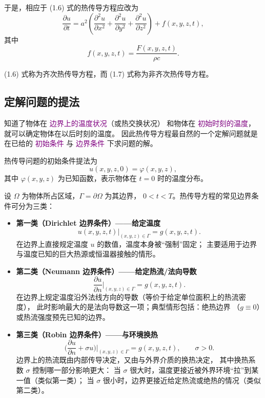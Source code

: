 于是，相应于 (1.6) 式的热传导方程应改为
\begin{equation}\label{eq:heat-nonhomogeneous}
\frac{\partial u}{\partial t}
= a^{2}\left(
\frac{\partial^{2}u}{\partial x^{2}}
+\frac{\partial^{2}u}{\partial y^{2}}
+\frac{\partial^{2}u}{\partial z^{2}}
\right)+f(x,y,z,t), \tag{1.7}
\end{equation}
其中
\begin{equation}\label{eq:f-source}
f(x,y,z,t)=\frac{F(x,y,z,t)}{\rho c}. \tag{1.8}
\end{equation}

(1.6) 式称为齐次热传导方程，而 (1.7) 式称为非齐次热传导方程。
\subsection{定解问题的提法}
\begin{note}
   知道了物体在 \textcolor{purple}{边界上的温度状况}（或热交换状况）
和物体在 \textcolor{purple}{初始时刻的温度}，
就可以确定物体在以后时刻的温度。
因此热传导方程最自然的一个定解问题就是在已给的
\textcolor{purple}{初始条件} 与 \textcolor{purple}{边界条件} 下求问题的解。
\end{note}
\begin{definition}[初始条件]
热传导问题的初始条件提法为
\begin{equation}\label{eq:init}
u(x,y,z,0)=\varphi(x,y,z),
\end{equation}
其中 $\varphi(x,y,z)$ 为已知函数，表示物体在 $t=0$ 时的温度分布。
\end{definition}
\begin{theorem}[热传导方程的三种典型边界条件]
设 $\Omega$ 为物体所占区域，$\Gamma=\partial\Omega$ 为其边界，
$0<t<T$。热传导方程的常见边界条件可分为三类：

\begin{itemize}
  \item[(1)] \textbf{第一类（Dirichlet 边界条件）——给定温度}
  \[
    u(x,y,z,t)\big|_{(x,y,z)\in\Gamma}=g(x,y,z,t).
  \]
  在边界上直接规定温度 $u$ 的数值，温度本身被“强制”固定；
  主要适用于边界与温度已知的巨大热源或恒温器接触的情形。

  \item[(2)] \textbf{第二类（Neumann 边界条件）——给定热流/法向导数}
  \[
    \frac{\partial u}{\partial n}\Big|_{(x,y,z)\in\Gamma}=g(x,y,z,t).
  \]
  在边界上规定温度沿外法线方向的导数（等价于给定单位面积上的热流密度），
  此时影响最大的是法向导数这一项；典型情形包括：绝热边界
 （$g\equiv 0$）或热流强度预先已知的边界。

  \item[(3)] \textbf{第三类（Robin 边界条件）——与环境换热}
  \[
    \Big(\frac{\partial u}{\partial n}+\sigma u\Big)\Big|_{(x,y,z)\in\Gamma}
      = g(x,y,z,t), \qquad \sigma>0.
  \]
  边界上的热流既由内部传导决定，又由与外界介质的换热决定，
  其中换热系数 $\sigma$ 控制哪一部分影响更大：
  当 $\sigma$ 很大时，温度更接近被外界环境“拉”到某一值（类似第一类）；
  当 $\sigma$ 很小时，边界更接近给定热流或绝热的情况（类似第二类）。
\end{itemize}
\end{theorem}
